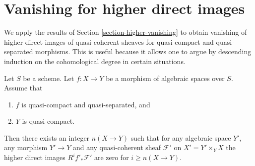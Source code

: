 \section{Vanishing for higher direct images}
\label{section-vanishing-higher-direct-images}

\noindent
We apply the results of
Section \ref{section-higher-vanishing}
to obtain vanishing of higher direct images of quasi-coherent sheaves
for quasi-compact and quasi-separated morphisms. This is useful because
it allows one to argue by descending induction on the cohomological degree
in certain situations.

\begin{lemma}
\label{lemma-vanishing-higher-direct-images}
Let $S$ be a scheme. Let $f : X \to Y$ be a
morphism of algebraic spaces over $S$.
Assume that
\begin{enumerate}
\item $f$ is quasi-compact and quasi-separated, and
\item $Y$ is quasi-compact.
\end{enumerate}
Then there exists an integer $n(X \to Y)$ such that
for any algebraic space $Y'$, any morphism $Y' \to Y$
and any quasi-coherent sheaf $\mathcal{F}'$ on $X' = Y' \times_Y X$
the higher direct images $R^if'_*\mathcal{F}'$ are zero for
$i \geq n(X \to Y)$.
\end{lemma}

